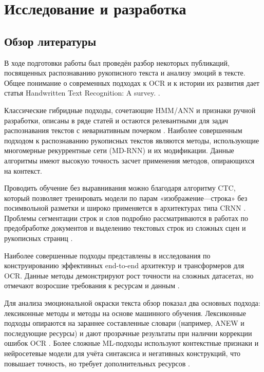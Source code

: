 \documentclass[12pt,a4paper]{article}
\begin{document}
\section{Исследование и разработка}
 
\subsection{Обзор литературы}

В ходе подготовки работы был проведён разбор некоторых публикаций, посвященных распознаванию
рукописного текста и анализу эмоций в тексте. Общее понимание о современных подходах к OCR и
к истории их развития дает статья Handwritten Text Recognition: A survey. \cite{survey2023}.

Классические гибридные подходы, сочетающие HMM/ANN и признаки ручной разработки, описаны в ряде
статей и остаются релевантными для задач распознавания текстов с невариативным почерком \cite{hybridhmm2010}.
Наиболее совершенным подходом к распознаванию рукописных текстов являются
методы, использующие многомерные рекуррентные сети (MD-RNN) и их модификации. Данные алгоритмы
имеют высокую точность засчет применения методов, опирающихся на контекст.

Проводить обучение без выравнивания можно благодаря алгоритму CTC, который позволяет тренировать
модели по парам «изображение—строка» без посимвольной разметки и широко применяется в архитектурах типа CRNN
\cite{ctc2006}. Проблемы сегментации строк и слов подробно рассматриваются в работах по предобработке документов и
выделению текстовых строк из сложных сцен и рукописных страниц \cite{segmentation2009}.

Наиболее совершенные подходы представлены в исследования по конструированию эффективных end-to-end архитектур
и трансформеров для OCR. Данные методы демонстрируют рост точности на сложных датасетах, но отмечают возросшие
требования к ресурсам и данным \cite{e2eneural2018,survey2023}.

Для анализа эмоциональной окраски текста обзор показал два основных подхода: лексиконные методы
и методы на основе машинного обучения. Лексиконные подходы опираются на зараннее составленные
словари (например, ANEW и последующие ресурсы) и дают прозрачные результаты при наличии
коррекции ошибок OCR \cite{anew1999,norms2013,ratings2018}. Более сложные ML-подходы используют
контекстные признаки и нейросетевые модели для учёта синтаксиса и негативных конструкций, что
повышает точность, но требует дополнительных ресурсов \cite{semanticemotion2019,rulesemotion2014}.
\end{document}
